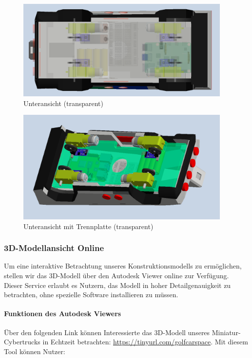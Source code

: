 \newpage

\begin{figure}[h]
    \centering
    \includegraphics[width=0.95\textwidth]{Resources/unten_transparent.png}
    \caption{Unteransicht (transparent)}
\end{figure}

\begin{figure}[h]
    \centering
    \includegraphics[width=0.95\textwidth]{Resources/unten_trennplatte_transparent.png}
    \caption{Unteransicht mit Trennplatte (transparent)}
\end{figure}

\newpage

\subsubsection{3D-Modellansicht Online}
Um eine interaktive Betrachtung unseres Konstruktionsmodells zu ermöglichen, stellen wir das 3D-Modell über den Autodesk Viewer online zur Verfügung. Dieser Service erlaubt es Nutzern, das Modell in hoher Detailgenauigkeit zu betrachten, ohne spezielle Software installieren zu müssen.

\paragraph{Funktionen des Autodesk Viewers}
Über den folgenden Link können Interessierte das 3D-Modell unseres Miniatur-Cybertrucks in Echtzeit betrachten: \newline \url{https://tinyurl.com/golfcarspace}.
\newline
Mit diesem Tool können Nutzer:

